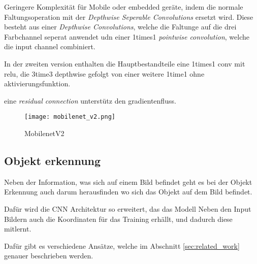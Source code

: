 Geringere Komplexität für Mobile oder embedded geräte, indem 
die normale Faltungsoperation mit der \textit{Depthwise Seperable 
Convolutions} ersetzt wird. 
Diese besteht aus einer \textit{Depthwise  
Convolutions}, welche die Faltunge auf 
die drei Farbchannel seperat anwendet udn einer 1times1
\textit{pointwise convolution}, welche die input channel combiniert. 





In der zweiten version \cite{sandlerMobileNetV2InvertedResiduals2019} enthalten die 
Hauptbestandteile eine 1times1 conv mit relu, die 
3time3 depthwise gefolgt von einer weitere 1time1 ohne aktivierungsfunktion.

eine \textit{residual connection} unterstütz den gradientenfluss.

\begin{figure}[H]
    \centering
    \texttt{[image: mobilenet\_v2.png]}
    \caption{MobilenetV2}
    \label{fig:mobilenetv2}
\end{figure}






\subsection{Objekt erkennung}\label{subsec:objdet_det}

Neben der Information, was sich auf einem Bild befindet geht 
es bei der Objekt Erkennung auch darum herausfinden wo sich das 
Objekt auf dem Bild befindet.

Dafür wird die CNN Architektur so erweitert, das das Modell 
Neben den Input Bildern auch die Koordinaten für das 
Training erhällt, und dadurch diese mitlernt.

Dafür gibt es verschiedene Ansätze, welche im Abschnitt \ref{sec:related_work}
genauer beschrieben werden.

